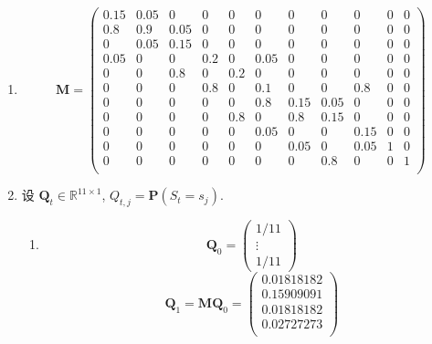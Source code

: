 \documentclass[11pt,letter,notitlepage]{article}
\begin{document}
\begin{solution}
	\begin{enumerate}
		\item $$\mathbf{M}=\begin{pmatrix}
				      0.15 & 0.05 & 0    & 0   & 0   & 0    & 0    & 0    & 0    & 0 & 0 \\
				      0.8  & 0.9  & 0.05 & 0   & 0   & 0    & 0    & 0    & 0    & 0 & 0 \\
				      0    & 0.05 & 0.15 & 0   & 0   & 0    & 0    & 0    & 0    & 0 & 0 \\
				      0.05 & 0    & 0    & 0.2 & 0   & 0.05 & 0    & 0    & 0    & 0 & 0 \\
				      0    & 0    & 0.8  & 0   & 0.2 & 0    & 0    & 0    & 0    & 0 & 0 \\
				      0    & 0    & 0    & 0.8 & 0   & 0.1  & 0    & 0    & 0.8  & 0 & 0 \\
				      0    & 0    & 0    & 0   & 0   & 0.8  & 0.15 & 0.05 & 0    & 0 & 0 \\
				      0    & 0    & 0    & 0   & 0.8 & 0    & 0.8  & 0.15 & 0    & 0 & 0 \\
				      0    & 0    & 0    & 0   & 0   & 0.05 & 0    & 0    & 0.15 & 0 & 0 \\
				      0    & 0    & 0    & 0   & 0   & 0    & 0.05 & 0    & 0.05 & 1 & 0 \\
				      0    & 0    & 0    & 0   & 0   & 0    & 0    & 0.8  & 0    & 0 & 1 \\
			      \end{pmatrix}$$
		\item 设 $\mathbf{Q}_t\in\mathbb{R}^{11\times 1}$, $Q_{t,j}=\mathbf{P}(S_t=s_j)$.
		      \begin{enumerate}
			      \item $$\mathbf{Q}_0=\begin{pmatrix}
					            1/11 \\ \vdots \\ 1/11
				            \end{pmatrix}$$
			            $$\mathbf{Q}_1=\mathbf{M}\mathbf{Q}_0=\begin{pmatrix}
					            0.01818182 \\
					            0.15909091 \\
					            0.01818182 \\
					            0.02727273 \\

\end{pmatrix}$$
\end{enumerate}
\end{enumerate}
\end{solution}
\end{document}
